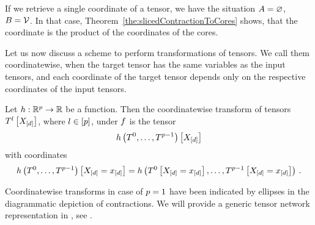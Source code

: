 If we retrieve a single coordinate of a tensor, we have the situation $A=\varnothing$, $B=\mathcal{V}$.
In that case, Theorem~\ref{the:slicedContractionToCores} shows, that the coordinate is the product of the coordinates of the cores. %

\label{sec:coordinatewiseTransforms}

Let us now discuss a scheme to perform transformations of tensors.
We call them coordinatewise, when the target tensor has the same variables as the input tensors, and each coordinate of the target tensor depends only on the respective coordinates of the input tensors. %

\begin{definition}
    \label{def:coordinatewiseTransform}
    Let $h: \mathbb{R}^{p} \rightarrow \mathbb{R}$ be a function.
    Then the coordinatewise transform of tensors $T^{l}\left[X_{[d]}\right]$, where $l\in[p]$, under $f$ is the tensor
    \begin{align*}
        {h}\left(T^{0},\ldots,T^{p-1}\right)\left[X_{[d]}\right]
    \end{align*}
    with coordinates
    \begin{align*}
        {h}\left(T^{0},\ldots,T^{p-1}\right)\left[X_{[d]}=x_{[d]}\right]
        = h\left(T^{0}\left[X_{[d]}=x_{[d]}\right],\ldots,T^{p-1}\left[X_{[d]}=x_{[d]}\right]\right) \, .
    \end{align*}
\end{definition}

Coordinatewise transforms in case of $p=1$ have been indicated by ellipses in the diagrammatic depiction of contractions.
We will provide a generic tensor network representation in , see .

